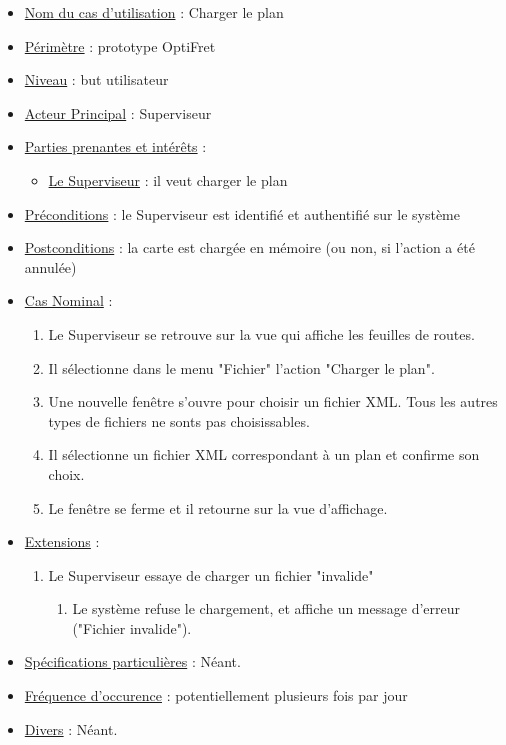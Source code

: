 \documentclass[a4paper]{article}
\begin{document}
\begin{itemize}[label = \textbullet, font = \color{orange}]
    \item \underline{Nom du cas d'utilisation} : Charger le plan
    \item \underline{Périmètre} : prototype OptiFret
    \item \underline{Niveau} : but utilisateur
    \item \underline{Acteur Principal} : Superviseur
    \item \underline{Parties prenantes et intérêts} :
    \begin{itemize}[label = \textbullet, font = \color{blue}]
        \item \underline{Le Superviseur} : il veut charger le plan
    \end{itemize}
    \item \underline{Préconditions} : le Superviseur est identifié et
        authentifié sur le système
    \item \underline{Postconditions} : la carte est chargée en mémoire (ou non,
        si l'action a été annulée)
    \item \underline{Cas Nominal} :
    \begin{enumerate}
        \item Le Superviseur se retrouve sur la vue qui affiche les feuilles de
            routes.
        \item Il sélectionne dans le menu "Fichier" l'action "Charger le plan".
        \item Une nouvelle fenêtre s'ouvre pour choisir un fichier XML. Tous
            les autres types de fichiers ne sonts pas choisissables.
        \item Il sélectionne un fichier XML correspondant à un plan et confirme
            son choix.
        \item Le fenêtre se ferme et il retourne sur la vue d'affichage.
    \end{enumerate}
    \item \underline{Extensions} :
    \begin{enumerate}
        \item Le Superviseur essaye de charger un fichier "invalide"
            \begin{enumerate}
                \item Le système refuse le chargement, et affiche un
                    message d'erreur ("Fichier invalide").
            \end{enumerate}
    \end{enumerate}
    \item \underline{Spécifications particulières} : Néant.
    \item \underline{Fréquence d'occurence} : potentiellement plusieurs fois
        par jour
    \item \underline{Divers} : Néant.
\end{itemize}
\end{document}
